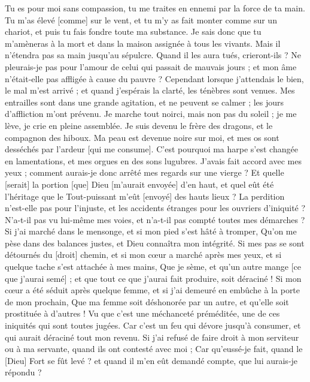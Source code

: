 \begin{multicols}{2}
Tu es pour moi sans compassion, tu me traites en ennemi par la force de ta main.
Tu m'as élevé [comme] sur le vent, et tu m'y as fait monter comme sur un chariot, et puis tu fais fondre toute ma substance.
Je sais donc que tu m'amèneras à la mort et dans la maison assignée à tous les vivants.
Mais il n'étendra pas sa main jusqu'au sépulcre. Quand il les aura tués, crieront-ils ?
Ne pleurais-je pas pour l'amour de celui qui passait de mauvais jours ; et mon âme n'était-elle pas affligée à cause du pauvre ?
Cependant lorsque j'attendais le bien, le mal m'est arrivé ; et quand j'espérais la clarté, les ténèbres sont venues.
Mes entrailles sont dans une grande agitation, et ne peuvent se calmer ; les jours d'affliction m'ont prévenu.
Je marche tout noirci, mais non pas du soleil ; je me lève, je crie en pleine assemblée.
Je suis devenu le frère des dragons, et le compagnon des hiboux.
Ma peau est devenue noire sur moi, et mes os sont desséchés par l'ardeur [qui me consume].
C'est pourquoi ma harpe s'est changée en lamentations, et mes orgues en des sons lugubres.
\VerseOne{}J'avais fait accord avec mes yeux ; comment aurais-je donc arrêté mes regards sur une vierge ?
Et quelle [serait] la portion [que] Dieu [m'aurait envoyée] d'en haut, et quel eût été l'héritage que le Tout-puissant m'eût [envoyé] des hauts lieux ?
La perdition n'est-elle pas pour l'injuste, et les accidents étranges pour les ouvriers d'iniquité ?
N'a-t-il pas vu lui-même mes voies, et n'a-t-il pas compté toutes mes démarches ?
Si j'ai marché dans le mensonge, et si mon pied s'est hâté à tromper,
Qu'on me pèse dans des balances justes, et Dieu connaîtra mon intégrité.
Si mes pas se sont détournés du [droit] chemin, et si mon cœur a marché après mes yeux, et si quelque tache s'est attachée à mes mains,
Que je sème, et qu'un autre mange [ce que j'aurai semé] ; et que tout ce que j'aurai fait produire, soit déraciné !
Si mon cœur a été séduit après quelque femme, et si j'ai demeuré en embûche à la porte de mon prochain,
Que ma femme soit déshonorée par un autre, et qu'elle soit prostituée à d'autres !
Vu que c'est une méchanceté préméditée, une de ces iniquités qui sont toutes jugées.
Car c'est un feu qui dévore jusqu'à consumer, et qui aurait déraciné tout mon revenu.
Si j'ai refusé de faire droit à mon serviteur ou à ma servante, quand ils ont contesté avec moi ;
Car qu'eussé-je fait, quand le [Dieu] Fort se fût levé ? et quand il m'en eût demandé compte, que lui aurais-je répondu ?

\end{multicols}
